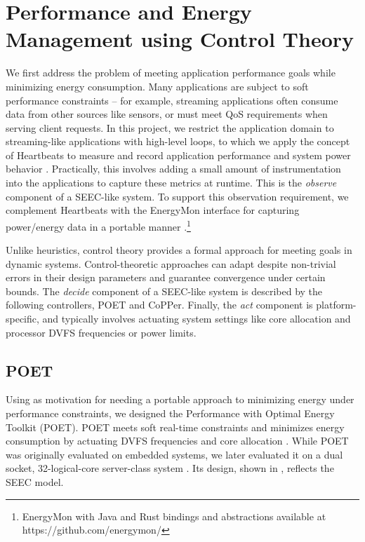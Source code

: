 \section{Performance and Energy Management using Control Theory}

We first address the problem of meeting application performance goals while minimizing energy consumption.
Many applications are subject to soft performance constraints -- for example, streaming applications often consume data from other sources like sensors, or must meet QoS requirements when serving client requests.
In this project, we restrict the application domain to streaming-like applications with high-level loops, to which we apply the concept of Heartbeats to measure and record application performance and system power behavior \cite{icac2010heartbeats}.
Practically, this involves adding a small amount of instrumentation into the applications to capture these metrics at runtime.
This is the \emph{observe} component of a SEEC-like system.
To support this observation requirement, we complement Heartbeats with the EnergyMon interface for capturing power/energy data in a portable manner \cite{energymon}.\footnote{EnergyMon with Java and Rust bindings and abstractions available at https://github.com/energymon/}

Unlike heuristics, control theory provides a formal approach for meeting goals in dynamic systems.
Control-theoretic approaches can adapt despite non-trivial errors in their design parameters and guarantee convergence under certain bounds.
The \emph{decide} component of a SEEC-like system is described by the following controllers, POET and CoPPer.
Finally, the \emph{act} component is platform-specific, and typically involves actuating system settings like core allocation and processor DVFS frequencies or power limits.


\subsection{POET}

Using \cite{Imes2014} as motivation for needing a portable approach to minimizing energy under performance constraints, we designed the Performance with Optimal Energy Toolkit (POET).
POET meets soft real-time constraints and minimizes energy consumption by actuating DVFS frequencies and core allocation \cite{POET}.
While POET was originally evaluated on embedded systems, we later evaluated it on a dual socket, 32-logical-core server-class system \cite{POETMCSoC}.
Its design, shown in , reflects the SEEC model.

